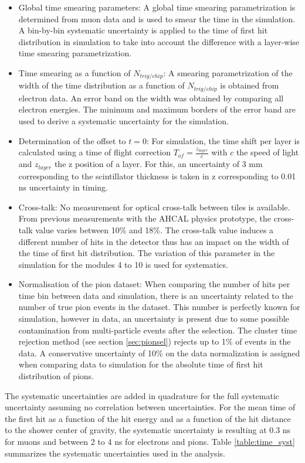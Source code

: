 \documentclass{JINST}
\begin{document}
\begin{itemize}
  \item Global time smearing parameters: A global time smearing parametrization is determined from muon data and is used to smear the time in the simulation. A bin-by-bin systematic uncertainty is applied to the time of first hit distribution in simulation to take into account the difference with a layer-wise time smearing parametrization.
  \item Time smearing as a function of $N_{trig/chip}$: A smearing parametrization of the width of the time distribution as a function of $N_{trig/chip}$ is obtained from electron data. An error band on the width was obtained by comparing all electron energies. The minimum and maximum borders of the error band are used to derive a systematic uncertainty for the simulation.
  \item Determination of the offset to $t=0$: For simulation, the time shift per layer is calculated using a time of flight correction $T_{of} = \frac{z_{layer}}{c}$ with $c$ the speed of light and $z_{layer}$ the z position of a layer. For this, an uncertainty of 3 mm corresponding to the scintillator thickness is taken in z corresponding to 0.01 ns uncertainty in timing.
  \item Cross-talk: No measurement for optical cross-talk between tiles is available. From previous measurements with the AHCAL physics prototype, the cross-talk value varies between 10\% and 18\%. The cross-talk value induces a different number of hits in the detector thus has an impact on the width of the time of first hit distribution. The variation of this parameter in the simulation for the modules 4 to 10 is used for systematics.
  \item Normalisation of the pion dataset: When comparing the number of hits per time bin between data and simulation, there is an uncertainty related to the number of true pion events in the dataset. This number is perfectly known for simulation, however in data, an uncertainty is present due to some possible contamination from multi-particle events after the selection. The cluster time rejection method (see section \ref{sec:pionsel}) rejects up to 1\% of events in the data. A conservative uncertainty of 10\% on the data normalization is assigned when comparing data to simulation for the absolute time of first hit distribution of pions.
\end{itemize}

The systematic uncertainties are added in quadrature for the full systematic uncertainty assuming no correlation between uncertainties. For the mean time of the first hit as a function of the hit energy and as a function of the hit distance to the shower center of gravity, the systematic uncertainty is resulting at 0.3 ns for muons and between 2 to 4 ns for electrons and pions. Table \ref{table:time_syst} summarizes the systematic uncertainties used in the analysis.
\end{document}
